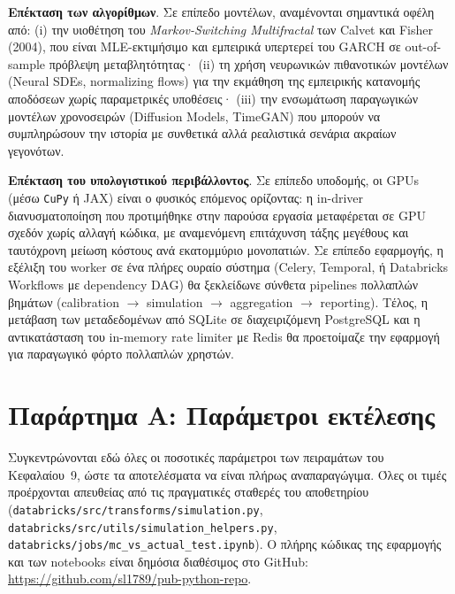 \documentclass[12pt]{article}
\begin{document}
\textbf{Επέκταση των αλγορίθμων}. Σε επίπεδο μοντέλων, αναμένονται σημαντικά οφέλη από: (i) την υιοθέτηση του \emph{Markov-Switching Multifractal} των Calvet και Fisher (2004), που είναι MLE-εκτιμήσιμο και εμπειρικά υπερτερεί του GARCH σε out-of-sample πρόβλεψη μεταβλητότητας· (ii) τη χρήση νευρωνικών πιθανοτικών μοντέλων (Neural SDEs, normalizing flows) για την εκμάθηση της εμπειρικής κατανομής αποδόσεων χωρίς παραμετρικές υποθέσεις· (iii) την ενσωμάτωση παραγωγικών μοντέλων χρονοσειρών (Diffusion Models, TimeGAN) που μπορούν να συμπληρώσουν την ιστορία με συνθετικά αλλά ρεαλιστικά σενάρια ακραίων γεγονότων.

\textbf{Επέκταση του υπολογιστικού περιβάλλοντος}. Σε επίπεδο υποδομής, οι GPUs (μέσω \texttt{CuPy} ή JAX) είναι ο φυσικός επόμενος ορίζοντας: η in-driver διανυσματοποίηση που προτιμήθηκε στην παρούσα εργασία μεταφέρεται σε GPU σχεδόν χωρίς αλλαγή κώδικα, με αναμενόμενη επιτάχυνση τάξης μεγέθους και ταυτόχρονη μείωση κόστους ανά εκατομμύριο μονοπατιών. Σε επίπεδο εφαρμογής, η εξέλιξη του worker σε ένα πλήρες ουραίο σύστημα (Celery, Temporal, ή Databricks Workflows με dependency DAG) θα ξεκλείδωνε σύνθετα pipelines πολλαπλών βημάτων (calibration $\to$ simulation $\to$ aggregation $\to$ reporting). Τέλος, η μετάβαση των μεταδεδομένων από SQLite σε διαχειριζόμενη PostgreSQL και η αντικατάσταση του in-memory rate limiter με Redis θα προετοίμαζε την εφαρμογή για παραγωγικό φόρτο πολλαπλών χρηστών.

\newpage

\appendix
\section{Παράρτημα Α: Παράμετροι εκτέλεσης}

Συγκεντρώνονται εδώ όλες οι ποσοτικές παράμετροι των πειραμάτων του Κεφαλαίου~9, ώστε τα αποτελέσματα να είναι πλήρως αναπαραγώγιμα. Όλες οι τιμές προέρχονται απευθείας από τις πραγματικές σταθερές του αποθετηρίου (\texttt{databricks/\allowbreak src/\allowbreak transforms/\allowbreak simulation.py}, \texttt{databricks/\allowbreak src/\allowbreak utils/\allowbreak simulation\_helpers.py}, \texttt{databricks/\allowbreak jobs/\allowbreak mc\_vs\_actual\_test.ipynb}). Ο πλήρης κώδικας της εφαρμογής και των notebooks είναι δημόσια διαθέσιμος στο GitHub: \url{https://github.com/sl1789/pub-python-repo}.
\end{document}
